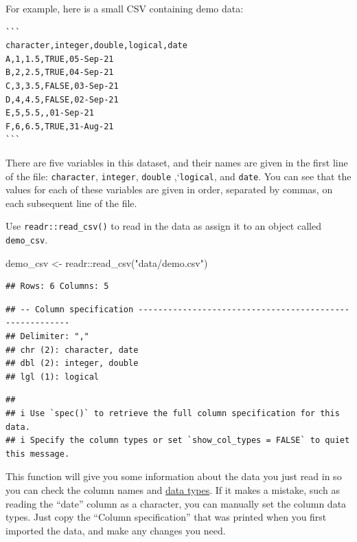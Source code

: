 \documentclass[
  oneside]{book}
\newenvironment{Shaded}{\begin{snugshade}}{\end{snugshade}}
\newcommand{\FunctionTok}[1]{\textcolor[rgb]{0.00,0.00,0.00}{#1}}
\newcommand{\NormalTok}[1]{#1}
\newcommand{\OtherTok}[1]{\textcolor[rgb]{0.56,0.35,0.01}{#1}}
\newcommand{\SpecialCharTok}[1]{\textcolor[rgb]{0.00,0.00,0.00}{#1}}
\newcommand{\StringTok}[1]{\textcolor[rgb]{0.31,0.60,0.02}{#1}}
\begin{document}
For example, here is a small CSV containing demo data:

\begin{verbatim}
```
character,integer,double,logical,date
A,1,1.5,TRUE,05-Sep-21
B,2,2.5,TRUE,04-Sep-21
C,3,3.5,FALSE,03-Sep-21
D,4,4.5,FALSE,02-Sep-21
E,5,5.5,,01-Sep-21
F,6,6.5,TRUE,31-Aug-21
```
\end{verbatim}

There are five variables in this dataset, and their names are given in the first line of the file: \texttt{character}, \texttt{integer}, \texttt{double} ,`\texttt{logical}, and \texttt{date}. You can see that the values for each of these variables are given in order, separated by commas, on each subsequent line of the file.

Use \texttt{readr::read\_csv()} to read in the data as assign it to an object called \texttt{demo\_csv}.

\begin{Shaded}
\begin{Highlighting}[]
\NormalTok{demo\_csv  }\OtherTok{\textless{}{-}}\NormalTok{ readr}\SpecialCharTok{::}\FunctionTok{read\_csv}\NormalTok{(}\StringTok{"data/demo.csv"}\NormalTok{)}
\end{Highlighting}
\end{Shaded}

\begin{verbatim}
## Rows: 6 Columns: 5
\end{verbatim}

\begin{verbatim}
## -- Column specification --------------------------------------------------------
## Delimiter: ","
## chr (2): character, date
## dbl (2): integer, double
## lgl (1): logical
\end{verbatim}

\begin{verbatim}
## 
## i Use `spec()` to retrieve the full column specification for this data.
## i Specify the column types or set `show_col_types = FALSE` to quiet this message.
\end{verbatim}

This function will give you some information about the data you just read in so you can check the column names and \protect\hyperlink{data_types}{data types}. If it makes a mistake, such as reading the ``date'' column as a character, you can manually set the column data types. Just copy the ``Column specification'' that was printed when you first imported the data, and make any changes you need.
\end{document}
